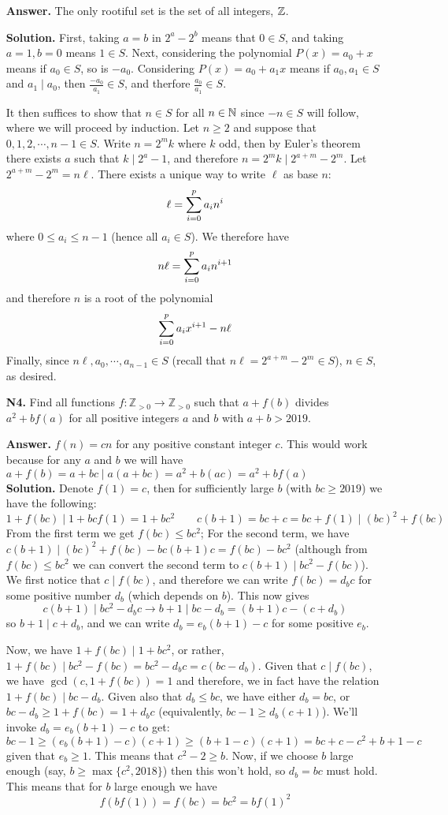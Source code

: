 \documentclass[11pt,a4paper]{article}
\begin{document}
\begin{enumerate}
	\textbf{Answer.} The only rootiful set is the set of all integers, ${\mathbb Z}$. 
	
	\textbf{Solution.} First, taking $a=b$ in $2^a-2^b$ means that $0\in S$, and taking $a=1, b=0$ means $1\in S$. Next, considering the polynomial $P(x)=a_0+x$ means if $a_0\in S$, so is $-a_0$. Considering $P(x)=a_0+a_1x$ means if $a_0, a_1\in S$ and $a_1\mid a_0$, then $\frac{-a_0}{a_1}\in S$, and therfore $\frac{a_0}{a_1}\in S$. 
	
	It then suffices to show that $n\in S$ for all $n\in{\mathbb N}$ since $-n\in S$ will follow, where we will proceed by induction. Let $n\ge 2$ and suppose that $0, 1, 2, \cdots , n-1\in S$.
	Write $n=2^mk$ where $k$ odd, then by Euler's theorem there exists $a$ such that $k\mid 2^a-1$, and therefore $n=2^mk\mid 2^{a+m}-2^m$. Let $2^{a+m}-2^m=n\ell$. There exists a unique way to write $\ell$ as base $n$: 
	\[
	\ell = \displaystyle\sum_{i=0}^{p}a_in^i
	\]
	where $0\le a_i\le n-1$ (hence all $a_i\in S$). We therefore have 
	\[
	n\ell =  \displaystyle\sum_{i=0}^{p}a_in^{i+1}
	\]
	and therefore $n$ is a root of the polynomial 
	\[
	\displaystyle\sum_{i=0}^{p}a_ix^{i+1}-n\ell
	\]
	Finally, since $n\ell, a_0, \cdots , a_{n-1}\in S$ (recall that $n\ell=2^{a+m}-2^m\in S$), $n\in S$, as desired. 
	
	\item[\textbf{N4.}] Find all functions $f:\mathbb Z_{>0}\to \mathbb Z_{>0}$ such that $a+f(b)$ divides $a^2+bf(a)$ for all positive integers $a$ and $b$ with $a+b>2019$.
	
	\textbf{Answer.} $f(n)=cn$ for any positive constant integer $c$. This would work because for any $a$ and $b$ we will have $a+f(b)=a+bc\mid a(a+bc)=a^2+b(ac)=a^2+bf(a)$\\
	\textbf{Solution.} Denote $f(1)=c$, then for sufficiently large $b$ (with $bc\ge 2019$) we have the following: 
	\[
	1+f(bc)\mid 1+bcf(1)=1+bc^2\qquad c(b+1)=bc+c=bc+f(1)\mid (bc)^2+f(bc)
	\]
	From the first term we get $f(bc)\le bc^2$; 
	For the second term, we have $c(b+1)\mid (bc)^2+f(bc)-bc(b+1)c=f(bc)-bc^2$ (although from $f(bc)\le bc^2$ we can convert the second term to $c(b+1)\mid bc^2-f(bc)$). 
	We first notice that $c\mid f(bc)$, and therefore we can write $f(bc)=d_bc$ for some positive number $d_b$ (which depends on $b$). This now gives 
	\[
	c(b+1)\mid bc^2-d_bc\to b+1\mid bc-d_b=(b+1)c-(c+d_b)
	\] 
	so $b+1\mid c+d_b$, and we can write $d_b=e_b(b+1)-c$ for some positive $e_b$. 
	
	Now, we have $1+f(bc)\mid 1+bc^2$, or rather, $1+f(bc)\mid bc^2-f(bc)=bc^2-d_bc=c(bc-d_b)$. Given that $c\mid f(bc)$, we have $\gcd(c, 1+f(bc))=1$ and therefore, we in fact have the relation $1+f(bc)\mid bc-d_b$. Given also that $d_b\le bc$, we have either $d_b=bc$, or $bc-d_b\ge 1+f(bc)=1+d_bc$ (equivalently, $bc-1\ge d_b(c+1)$). 
	We'll invoke $d_b=e_b(b+1)-c$ to get: 
	\[
	bc -1 \ge (e_b(b+1)-c)(c+1)\ge (b+1-c)(c+1)=bc+c-c^2+b+1-c
	\]
	given that $e_b\ge 1$. This means that $c^2-2\ge b$. Now, if we choose $b$ large enough (say, $b\ge \max\{c^2, 2018\}$) then this won't hold, so $d_b=bc$ must hold. This means that for $b$ large enough we have 
	\[
	f(bf(1))=f(bc)=bc^2=bf(1)^2
	\]
	

\end{enumerate}
\end{document}
